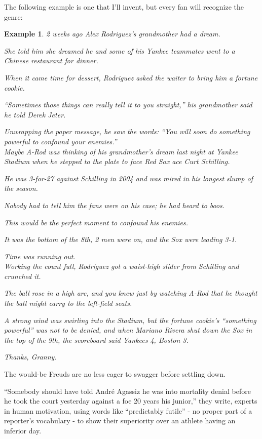 \documentclass{book}
\numberwithin{equation}{section}
\newtheorem{example}{Example}[chapter]
\begin{document}
The following example is one that I'll invent, but every fan will recognize the genre:
\begin{example}
    2 weeks ago Alex Rodriguez's grandmother had a dream.
    
    She told him she dreamed he and some of his Yankee teammates went to a Chinese restaurant for dinner.
    
    When it came time for dessert, Rodriguez asked the waiter to bring him a fortune cookie.
    
    ``Sometimes those things can really tell it to you straight,'' his grandmother said he told Derek Jeter.
    
    Unwrapping the paper message, he saw the words: ``You will soon do something powerful to confound your enemies.''
    \\
    
    Maybe A-Rod was thinking of his grandmother's dream last night at Yankee Stadium when he stepped to the plate to face Red Sox ace Curt Schilling.
    
    He was 3-for-27 against Schilling in 2004 and was mired in his longest slump of the season.
    
    Nobody had to tell him the fans were on his case; he had heard to boos.
    
    This would be the perfect moment to confound his enemies.
    
    It was the bottom of the 8th, 2 men were on, and the Sox were leading 3-1.
    
    Time was running out.\\
    
    Working the count full, Rodriguez got a waist-high slider from Schilling and crunched it.
    
    The ball rose in a high arc, and you knew just by watching A-Rod that he thought the ball might carry to the left-field seats.
    
    A strong wind was swirling into the Stadium, but the fortune cookie's ``something powerful'' was not to be denied, and when Mariano Rivera shut down the Sox in the top of the 9th, the scoreboard said Yankees 4, Boston 3.
    
    Thanks, Granny.
\end{example}
The would-be Freuds are no less eager to swagger before settling down.

``Somebody should have told Andr\'e Agassiz he was into mortality denial before he took the court yesterday against a foe 20 years his junior,'' they write, experts in human motivation, using words like ``predictably futile'' - no proper part of a reporter's vocabulary - to show their superiority over an athlete having an inferior day.
\end{document}
